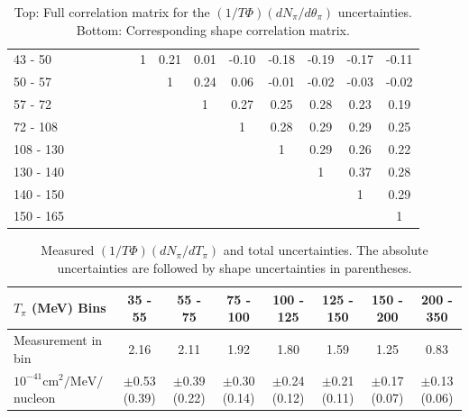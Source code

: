 \begin{table}[h]
\begin{tabular}{l|ccccccccccccc}
43 - 50 &  &  &  &  &  & 1 & 0.21 & 0.01 & -0.10 & -0.18 & -0.19 & -0.17 & -0.11 \\ 
50 - 57 &  &  &  &  &  &  & 1 & 0.24 & 0.06 & -0.01 & -0.02 & -0.03 & -0.02 \\ 
57 - 72 &  &  &  &  &  &  &  & 1 & 0.27 & 0.25 & 0.28 & 0.23 & 0.19 \\ 
72 - 108 &  &  &  &  &  &  &  &  & 1 & 0.28 & 0.29 & 0.29 & 0.25 \\ 
108 - 130 &  &  &  &  &  &  &  &  &  & 1 & 0.29 & 0.26 & 0.22 \\ 
130 - 140 &  &  &  &  &  &  &  &  &  &  & 1 & 0.37 & 0.28 \\ 
140 - 150 &  &  &  &  &  &  &  &  &  &  &  & 1 & 0.29 \\ 
150 - 165 &  &  &  &  &  &  &  &  &  &  &  &  & 1 \\ 
\hline\hline
\end{tabular}
\caption{Top: Full correlation matrix for the \ccpi $(1/T\Phi)(dN_{\pi} / d\theta_\pi)$ uncertainties.  Bottom: Corresponding shape correlation matrix.}
\end{table}
\endgroup

\clearpage
\begingroup
\squeezetable
\begin{table}[h]
\begin{tabular}{l|ccccccc}
\hline\hline
$T_{\pi}$ (MeV) Bins & 35 - 55 & 55 - 75 & 75 - 100 & 100 - 125 & 125 - 150 & 150 - 200 & 200 - 350 \\ 
\hline
Measurement in bin & 2.16 & 2.11 & 1.92 & 1.80 & 1.59 & 1.25 & 0.83 \\ 
$10^{-41}\mathrm{cm}^2/\mathrm{MeV}/$nucleon &  $\pm$0.53 (0.39) &  $\pm$0.39 (0.22) &  $\pm$0.30 (0.14) &  $\pm$0.24 (0.12) &  $\pm$0.21 (0.11) &  $\pm$0.17 (0.07) &  $\pm$0.13 (0.06) \\ 
\hline\hline
\end{tabular}
\caption{Measured \ccpi $(1/T\Phi)(dN_{\pi} / dT_\pi)$ and total uncertainties.  The absolute uncertainties are followed by shape uncertainties in parentheses.}
\end{table}
\endgroup

